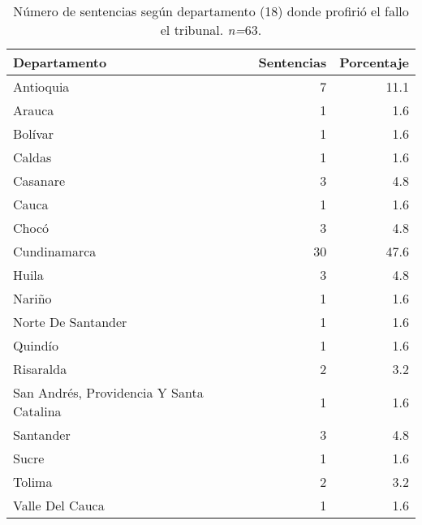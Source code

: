 \begin{table}[!htbp]
\centering
\caption{Número de sentencias según departamento (18) donde profirió el fallo el tribunal. \textit{n=}63.} 
\label{tab:depfal}
\begin{tabular}{lrr}
  \hline
Departamento & Sentencias & Porcentaje \\ 
  \hline
Antioquia &  7 & 11.1 \\ 
  Arauca &  1 & 1.6 \\ 
  Bolívar &  1 & 1.6 \\ 
  Caldas &  1 & 1.6 \\ 
  Casanare &  3 & 4.8 \\ 
  Cauca &  1 & 1.6 \\ 
  Chocó &  3 & 4.8 \\ 
  Cundinamarca & 30 & 47.6 \\ 
  Huila &  3 & 4.8 \\ 
  Nariño &  1 & 1.6 \\ 
  Norte De Santander &  1 & 1.6 \\ 
  Quindío &  1 & 1.6 \\ 
  Risaralda &  2 & 3.2 \\ 
  San Andrés, Providencia Y Santa Catalina &  1 & 1.6 \\ 
  Santander &  3 & 4.8 \\ 
  Sucre &  1 & 1.6 \\ 
  Tolima &  2 & 3.2 \\ 
  Valle Del Cauca &  1 & 1.6 \\ 
   \hline
\end{tabular}
\end{table}
